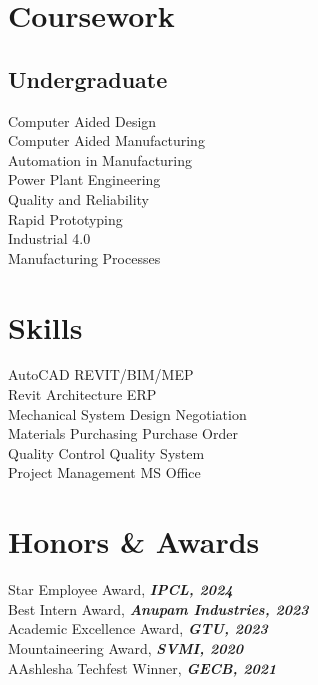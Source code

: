\documentclass[]{deedy-resume-openfont}
\begin{document}
\begin{minipage}[t]{0.35\textwidth}

\section{Coursework}
\subsection{Undergraduate}
Computer Aided Design \\
Computer Aided Manufacturing  \\
Automation in Manufacturing  \\
Power Plant Engineering \\
Quality and Reliability  \\
Rapid Prototyping \\
Industrial 4.0 \\
Manufacturing Processes \\



\section{Skills}
AutoCAD \textbullet{} REVIT/BIM/MEP \\ 
\textbullet{} Revit Architecture \textbullet{} ERP \\
Mechanical System Design \textbullet{} Negotiation \\
\textbullet{} Materials Purchasing \textbullet{} Purchase Order \\
\textbullet{} Quality Control \textbullet{} Quality System \\
\textbullet{} Project Management \textbullet{} MS Office
\sectionsep


\section{Honors \& Awards}
Star Employee Award, {\footnotesize \textit{\textbf{IPCL, 2024}}}\\
Best Intern Award, {\footnotesize \textit{\textbf{Anupam Industries, 2023}}}\\
Academic Excellence Award, {\footnotesize \textit{\textbf{GTU, 2023}}}\\
Mountaineering Award, {\footnotesize \textit{\textbf{SVMI, 2020}}}\\
AAshlesha Techfest Winner, {\footnotesize \textit{\textbf{GECB, 2021}}}\\
\sectionsep


\end{minipage}
\end{document}

